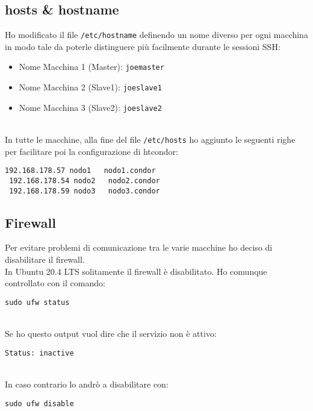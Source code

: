  \subsection{hosts \& hostname}
 \label{sec:hosts}
 
 Ho modificato il file \lstinline[style=cmd]|/etc/hostname| definendo un nome diverso per ogni macchina in modo
 tale da poterle distinguere pi\`{u} facilmente durante le sessioni SSH:
 
 \begin{itemize}
 	\item Nome Macchina 1 (Master): \lstinline[style=cmd]|joemaster|
 	\item Nome Macchina 2 (Slave1): \lstinline[style=cmd]|joeslave1|
 	\item Nome Macchina 3 (Slave2): \lstinline[style=cmd]|joeslave2|
 \end{itemize} 
\ \\
In tutte le macchine, alla fine del file \lstinline[style=cmd]|/etc/hosts| ho aggiunto le seguenti righe per
facilitare poi la configurazione di htcondor:

\begin{lstlisting}[style=cmd]
 192.168.178.57	nodo1	nodo1.condor
 192.168.178.54	nodo2	nodo2.condor
 192.168.178.59	nodo3	nodo3.condor
\end{lstlisting}

\subsection{Firewall}

Per evitare problemi di comunicazione tra le varie macchine ho deciso di disabilitare il firewall.\\
In Ubuntu 20.4 LTS solitamente il firewall \`{e} disabilitato. Ho comunque controllato con il comando:

\begin{lstlisting}[style=cmd]
 sudo ufw status
\end{lstlisting}
\ \\
Se ho questo output vuol dire che il servizio non \`{e} attivo:

\begin{lstlisting}[style=output]
 Status: inactive
\end{lstlisting}
\ \\
In caso contrario lo andr\`{o} a disabilitare con:

\begin{lstlisting}[style=cmd]
 sudo ufw disable
\end{lstlisting}

